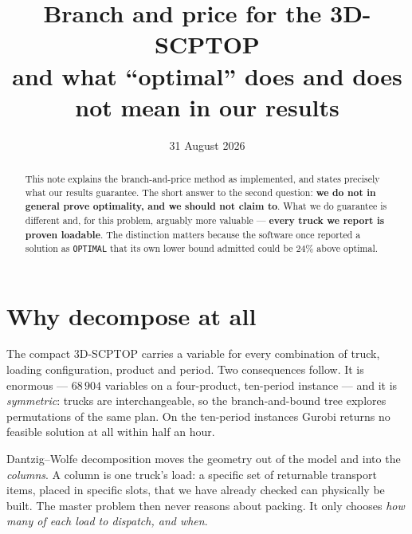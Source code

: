 \documentclass[11pt,a4paper]{article}
\title{Branch and price for the 3D-SCPTOP\\
\large and what ``optimal'' does and does not mean in our results}
\author{}
\date{31 August 2026}
\begin{document}
\maketitle

\begin{abstract}
\noindent
This note explains the branch-and-price method as implemented, and states
precisely what our results guarantee. The short answer to the second question:
\textbf{we do not in general prove optimality, and we should not claim to}. What
we do guarantee is different and, for this problem, arguably more valuable ---
\textbf{every truck we report is proven loadable}. The distinction matters
because the software once reported a solution as \texttt{OPTIMAL} that its own
lower bound admitted could be $24\%$ above optimal.
\end{abstract}

\section{Why decompose at all}

The compact 3D-SCPTOP carries a variable for every combination of truck,
loading configuration, product and period. Two consequences follow. It is
enormous --- $68\,904$ variables on a four-product, ten-period instance --- and
it is \emph{symmetric}: trucks are interchangeable, so the branch-and-bound tree
explores permutations of the same plan. On the ten-period instances Gurobi
returns no feasible solution at all within half an hour.

Dantzig--Wolfe decomposition moves the geometry out of the model and into the
\emph{columns}. A column is one truck's load: a specific set of returnable
transport items, placed in specific slots, that we have already checked can
physically be built. The master problem then never reasons about packing. It
only chooses \emph{how many of each load to dispatch, and when}.

\begin{center}
\end{center}
\end{document}
